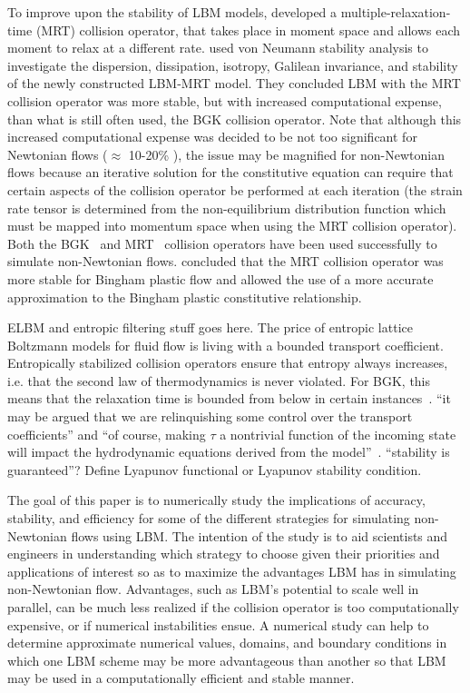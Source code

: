 \documentclass{article}
\begin{document}
To improve upon the stability of LBM models, \citet{d1994generalized} developed a multiple-relaxation-time (MRT) collision operator, that takes place in moment space and allows each moment to relax at a different rate.
\citet{lallemand2000theory} used von Neumann stability analysis to investigate the dispersion, dissipation, isotropy, Galilean invariance, and stability of the newly constructed LBM-MRT model.
They concluded LBM with the MRT collision operator was more stable, but with increased computational expense, than what is still often used, the BGK collision operator.
Note that although this increased computational expense was decided to be not too significant for Newtonian flows ($\approx$ 10-20\% \cite{lallemand2000theory}), the issue may be magnified for non-Newtonian flows because an iterative solution for the constitutive equation can require that certain aspects of the collision operator be performed at each iteration (the strain rate tensor is determined from the non-equilibrium distribution function which must be mapped into momentum space when using the MRT collision operator).
Both the BGK~\cite{wang2011lattice,ashrafizaadeh2009comparison,wang2015localized,tang2011bingham} and MRT~\cite{chen2014simulations,fallah2012multiple,chai2011multiple} collision operators have been used successfully to simulate non-Newtonian flows.
\citeauthor{chen2014simulations} concluded that the MRT collision operator was more stable for Bingham plastic flow and allowed the use of a more accurate approximation to the Bingham plastic constitutive relationship.

{\color{red} 
ELBM and entropic filtering stuff goes here.
The price of entropic lattice Boltzmann models for fluid flow is living with a bounded transport coefficient.
Entropically stabilized collision operators ensure that entropy always increases, i.e. that the second law of thermodynamics is never violated.
For BGK, this means that the relaxation time is bounded from below in certain instances~\cite{boghosian2001entropic}.
``it may be argued that we are relinquishing some control over the transport coefficients'' and ``of course, making $\tau$ a nontrivial function of the incoming state will impact the hydrodynamic equations derived from the model''~\cite{boghosian2001entropic}.
``stability is guaranteed''?
Define Lyapunov functional or Lyapunov stability condition.
}

The goal of this paper is to numerically study the implications of accuracy, stability, and efficiency for some of the different strategies for simulating non-Newtonian flows using LBM. The intention of the study is to aid scientists and engineers in understanding which strategy to choose given their priorities and applications of interest so as to maximize the advantages LBM has in simulating non-Newtonian flow.
Advantages, such as LBM's potential to scale well in parallel, can be much less realized if the collision operator is too computationally expensive, or if numerical instabilities ensue.
A numerical study can help to determine approximate numerical values, domains, and boundary conditions in which one LBM scheme may be more advantageous than another so that LBM may be used in a computationally efficient and stable manner.
\end{document}
